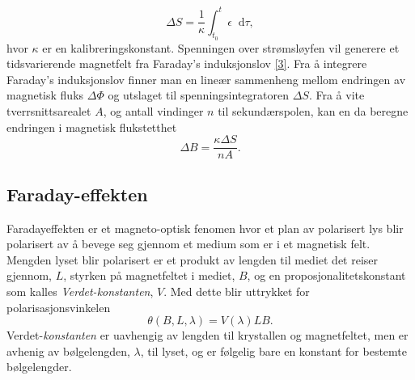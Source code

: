 \documentclass[%
 reprint,
 amsmath,amssymb,
 aps,
 norsk,
]{revtex4-1}
\newcommand*\diff{\mathop{}\!\mathrm{d}}
\begin{document}
\begin{equation}
  \Delta S = \frac{1}{\kappa}\int_{t_0}^{t}\epsilon \diff \tau, \label{deltas_new}
\end{equation}
hvor $\kappa$ er en kalibreringskonstant. Spenningen over strømsløyfen vil generere et tidsvarierende magnetfelt fra Faraday's induksjonslov \eqref{3}. Fra å integrere Faraday's induksjonslov finner man en lineær sammenheng mellom endringen av magnetisk fluks $\Delta \Phi$ og utslaget til spenningsintegratoren $\Delta S$. Fra å vite tverrsnittsarealet $A$, og antall vindinger $n$ til sekundærspolen, kan en da beregne endringen i magnetisk flukstetthet
\begin{equation}
  \Delta B = \frac{\kappa\Delta S}{nA}.\label{deltab}
\end{equation}
\subsection{Faraday-effekten}
Faradayeffekten er et magneto-optisk fenomen hvor et plan av polarisert lys blir polarisert av å bevege seg gjennom et medium som er i et magnetisk felt. Mengden lyset blir polarisert er et produkt av lengden til mediet det reiser gjennom, $L$, styrken på magnetfeltet i mediet, $B$, og en proposjonalitetskonstant som kalles \textit{Verdet-konstanten}, $V$. Med dette blir uttrykket for polarisasjonsvinkelen
\begin{equation}
  \theta\left(B, L, \lambda\right) = V\left(\lambda\right)LB.\label{verdet}
\end{equation}
Verdet-\textit{konstanten} er uavhengig av lengden til krystallen og magnetfeltet, men er avhenig av bølgelengden, $\lambda$, til lyset, og er følgelig bare en konstant for bestemte bølgelengder.\\
\end{document}

